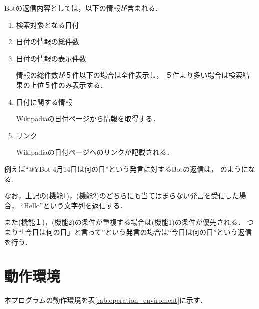 \documentclass[fleqn, 14pt]{extarticlej}
\begin{document}
\begin{description}
  Botの返信内容としては，以下の情報が含まれる．
  \begin{enumerate}
  \item{検索対象となる日付}
  \item{日付の情報の総件数}
  \item{日付の情報の表示件数}
    
    情報の総件数が５件以下の場合は全件表示し，
    ５件より多い場合は検索結果の上位５件のみ表示する．
  \item{日付に関する情報}
    
    Wikipadiaの日付ページから情報を取得する．
  \item{リンク}
    
    Wikipadiaの日付ページへのリンクが記載される．
  \end{enumerate}

  例えば``@YBot 4月14日は何の日''という発言に対するBotの返信は，
  のようになる.


\end{description}

 
なお，上記の(機能1)，(機能2)のどちらにも当てはまらない発言を受信した場合，
``Hello''という文字列を返信する．

また(機能１)，(機能2)の条件が重複する場合は(機能1)の条件が優先される．
つまり``「今日は何の日」と言って''という発言の場合は``今日は何の日''という返信を行う．

\section{動作環境}
\label{sec:operation_enviroment}
本プログラムの動作環境を表\ref{tab:operation_enviroment}に示す．

\begin{table}[bt]
  \begin{center}
    \caption{動作環境}
    \label{tab:operation_enviroment}
    \vspace{0.3cm}
  \end{center}
\end{table}
\end{document}
